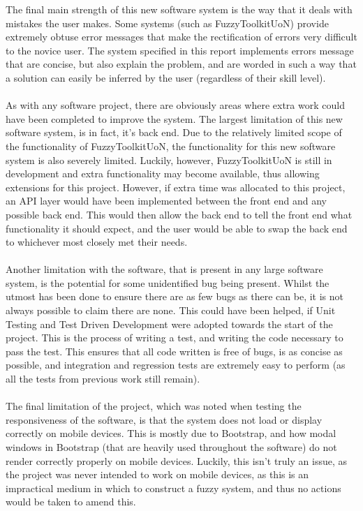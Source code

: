 The final main strength of this new software system is the way that it deals with mistakes the user makes. Some systems (such as FuzzyToolkitUoN) provide extremely obtuse error messages that make the rectification of errors very difficult to the novice user. The system specified in this report implements errors message that are concise, but also explain the problem, and are worded in such a way that a solution can easily be inferred by the user (regardless of their skill level).\ \\
\ \\
As with any software project, there are obviously areas where extra work could have been completed to improve the system. The largest limitation of this new software system, is in fact, it's back end. Due to the relatively limited scope of the functionality of FuzzyToolkitUoN, the functionality for this new software system is also severely limited. Luckily, however, FuzzyToolkitUoN is still in development and extra functionality may become available, thus allowing extensions for this project. However, if extra time was allocated to this project, an API layer would have been implemented between the front end and any possible back end. This would then allow the back end to tell the front end what functionality it should expect, and the user would be able to swap the back end to whichever most closely met their needs.\ \\
\ \\
Another limitation with the software, that is present in any large software system, is the potential for some unidentified bug being present. Whilst the utmost has been done to ensure there are as few bugs as there can be, it is not always possible to claim there are none. This could have been helped, if Unit Testing and Test Driven Development were adopted towards the start of the project. This is the process of writing a test, and writing the code necessary to pass the test. This ensures that all code written is free of bugs, is as concise as possible, and integration and regression tests are extremely easy to perform\cite{olan2003unit} (as all the tests from previous work still remain).\ \\
\ \\
The final limitation of the project, which was noted when testing the responsiveness of the software, is that the system does not load or display correctly on mobile devices. This is mostly due to Bootstrap, and how modal windows in Bootstrap (that are heavily used throughout the software) do not render correctly properly on mobile devices. Luckily, this isn't truly an issue, as the project was never intended to work on mobile devices, as this is an impractical medium in which to construct a fuzzy system, and thus no actions would be taken to amend this.
